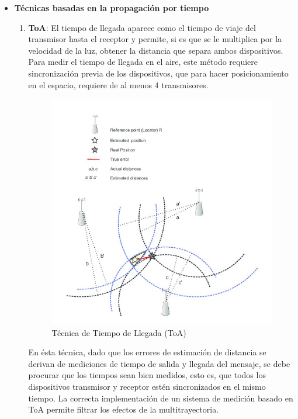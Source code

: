 \begin{itemize}
    \item{\textbf{Técnicas basadas en la propagación por tiempo}
    
    \begin{enumerate}
        \item {\textbf{\ac{ToA}}: \label{ToA} El tiempo de llegada aparece como el tiempo de viaje del transmisor hasta el receptor y permite, si es que se le multiplica por la velocidad de la luz, obtener la distancia que separa ambos dispositivos. Para medir el tiempo de llegada en el aire, este método requiere sincronización previa de los dispositivos, que para hacer posicionamiento en el espacio, requiere de al menos 4 transmisores.
        
         \begin{figure}[h!]
            \centering
            \includegraphics[scale=1]{./images/toa}
            \caption{Técnica de Tiempo de Llegada (ToA)}
            \label{fig:ToA}
        \end{figure}
            
        En ésta técnica, dado que los errores de estimación de distancia se derivan de mediciones de tiempo de salida y llegada del mensaje, se debe procurar que los tiempos sean bien medidos, esto es, que todos los dispositivos transmisor y receptor estén sincronizados en el mismo tiempo. La correcta implementación de un sistema de medición basado en ToA permite filtrar los efectos de la multitrayectoria.\\}
        

\end{enumerate}}
\end{itemize}
